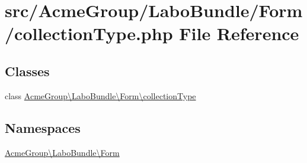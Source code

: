 \hypertarget{collection_type_8php}{\section{src/\+Acme\+Group/\+Labo\+Bundle/\+Form/collection\+Type.php File Reference}
\label{collection_type_8php}
}
\subsection*{Classes}
\begin{DoxyCompactItemize}
\item 
class \hyperlink{class_acme_group_1_1_labo_bundle_1_1_form_1_1collection_type}{Acme\+Group\textbackslash{}\+Labo\+Bundle\textbackslash{}\+Form\textbackslash{}collection\+Type}
\end{DoxyCompactItemize}
\subsection*{Namespaces}
\begin{DoxyCompactItemize}
\item 
 \hyperlink{namespace_acme_group_1_1_labo_bundle_1_1_form}{Acme\+Group\textbackslash{}\+Labo\+Bundle\textbackslash{}\+Form}
\end{DoxyCompactItemize}
